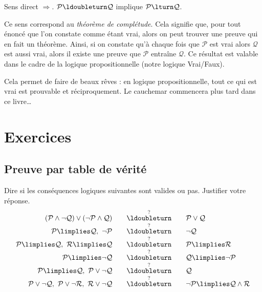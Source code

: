 \documentclass[11pt,class=report,crop=false]{standalone}
\begin{document}
Sens direct $\Rightarrow$. $\mathcal{P} \ldoubleturn \mathcal{Q}$ implique $\mathcal{P} \lturn \mathcal{Q}$.

Ce sens correspond au \emph{théorème de complétude}.
Cela signifie que, pour tout énoncé que l'on constate comme étant vrai, alors on peut trouver une preuve qui en fait un théorème.
Ainsi, si on constate qu'à chaque fois que $\mathcal{P}$ est vrai alors $\mathcal{Q}$ est aussi vrai, alors il existe une preuve que $\mathcal{P}$ entraîne $\mathcal{Q}$.
Ce résultat est valable dans le cadre de la logique propositionnelle (notre logique Vrai/Faux).

Cela permet de faire de beaux rêves : en logique propositionnelle, tout ce qui est vrai est prouvable et réciproquement. Le cauchemar commencera plus tard dans ce livre\ldots



\section*{Exercices}

\subsection*{Preuve par table de vérité}

\begin{exercicecours}
	Dire si les conséquences logiques suivantes sont valides ou pas. Justifier votre réponse.
	\[
	\begin{array}{rcl}
		(\mathcal{P} \land \lnot \mathcal{Q}) \lor (\lnot \mathcal{P} \land \mathcal{Q}) 
		&\quad \stackrel{?}{\ldoubleturn} \quad& 
		\mathcal{P} \lor \mathcal{Q} \\
		\mathcal{P} \limplies \mathcal{Q} , \  
		\lnot \mathcal{P} 
		&\quad \stackrel{?}{\ldoubleturn} \quad&  
		\lnot \mathcal{Q} \\
		\mathcal{P} \limplies \mathcal{Q} , \ 
		\mathcal{R} \limplies \mathcal{Q}
		&\quad \stackrel{?}{\ldoubleturn} \quad&  
		\mathcal{P} \limplies \mathcal{R} \\
		\mathcal{P} \limplies \lnot\mathcal{Q}
		&\quad \stackrel{?}{\ldoubleturn} \quad&  
		\mathcal{Q} \limplies \lnot \mathcal{P}  \\	
		\mathcal{P} \limplies \mathcal{Q} , \ 
		\mathcal{P} \lor \lnot \mathcal{Q}	
		&\quad \stackrel{?}{\ldoubleturn} \quad&  
		\mathcal{Q} \\	
		\mathcal{P} \lor \lnot \mathcal{Q} , \ 								
		\mathcal{P} \lor \lnot \mathcal{R} , \ 	
		\mathcal{R} \lor \lnot \mathcal{Q}
		&\quad \stackrel{?}{\ldoubleturn} \quad& 
		\lnot\mathcal{P} \limplies \mathcal{Q} \land \mathcal{R} 	
	\end{array}\]
\end{exercicecours}
\end{document}
